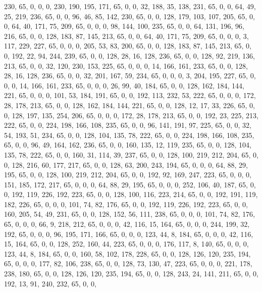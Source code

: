 \begin{DoxyCode}
       230, 65, 0, 0, 0, 230, 190, 195, 171, 65, 0, 0, 32, 188, 35, 138, 231, 65, 0, 0, 64, 49, 25, 219, 236, 65,
       0, 0, 96, 46, 85, 142, 230, 65, 0, 0, 128, 179, 103, 107, 205, 65, 0, 0, 64, 40, 171, 75, 209, 65, 0, 0, 0,
       98, 144, 100, 235, 65, 0, 0, 64, 131, 196, 96, 216, 65, 0, 0, 128, 183, 87, 145, 213, 65, 0, 0, 64, 40, 171,
       75, 209, 65, 0, 0, 0, 3, 117, 229, 227, 65, 0, 0, 0, 205, 53, 83, 200, 65, 0, 0, 128, 183, 87, 145, 213,
       65, 0, 0, 192, 22, 94, 244, 239, 65, 0, 0, 128, 28, 16, 128, 236, 65, 0, 0, 128, 92, 219, 136, 213, 65, 0, 0,
       32, 120, 230, 153, 225, 65, 0, 0, 0, 14, 166, 161, 233, 65, 0, 0, 128, 28, 16, 128, 236, 65, 0, 0, 32, 201,
       167, 59, 234, 65, 0, 0, 0, 3, 204, 195, 227, 65, 0, 0, 0, 14, 166, 161, 233, 65, 0, 0, 0, 26, 99, 40, 184,
       65, 0, 0, 128, 162, 184, 144, 221, 65, 0, 0, 0, 101, 53, 184, 191, 65, 0, 0, 192, 113, 232, 53, 222, 65, 0,
       0, 0, 172, 28, 178, 213, 65, 0, 0, 128, 162, 184, 144, 221, 65, 0, 0, 128, 12, 17, 33, 226, 65, 0, 0, 128,
       197, 135, 254, 206, 65, 0, 0, 0, 172, 28, 178, 213, 65, 0, 0, 192, 23, 225, 213, 222, 65, 0, 0, 224, 198, 166,
       108, 235, 65, 0, 0, 96, 141, 191, 97, 225, 65, 0, 0, 32, 54, 193, 51, 234, 65, 0, 0, 128, 104, 135, 78,
       222, 65, 0, 0, 224, 198, 166, 108, 235, 65, 0, 0, 96, 49, 164, 162, 236, 65, 0, 0, 160, 135, 12, 119, 235, 65,
       0, 0, 128, 104, 135, 78, 222, 65, 0, 0, 160, 31, 114, 39, 237, 65, 0, 0, 128, 100, 219, 212, 204, 65, 0, 0,
       128, 216, 60, 177, 217, 65, 0, 0, 128, 63, 200, 243, 194, 65, 0, 0, 0, 64, 88, 29, 195, 65, 0, 0, 128, 100,
       219, 212, 204, 65, 0, 0, 192, 92, 169, 247, 223, 65, 0, 0, 0, 151, 185, 172, 217, 65, 0, 0, 0, 64, 88, 29,
       195, 65, 0, 0, 0, 252, 106, 40, 187, 65, 0, 0, 192, 119, 226, 192, 223, 65, 0, 0, 128, 100, 116, 223, 214,
       65, 0, 0, 192, 191, 119, 182, 226, 65, 0, 0, 0, 101, 74, 82, 176, 65, 0, 0, 192, 119, 226, 192, 223, 65, 0, 0,
       160, 205, 54, 49, 231, 65, 0, 0, 128, 152, 56, 111, 238, 65, 0, 0, 0, 101, 74, 82, 176, 65, 0, 0, 0, 66, 9,
       218, 212, 65, 0, 0, 0, 42, 116, 15, 164, 65, 0, 0, 0, 244, 199, 32, 192, 65, 0, 0, 0, 96, 195, 171, 166,
       65, 0, 0, 0, 123, 44, 8, 184, 65, 0, 0, 0, 42, 116, 15, 164, 65, 0, 0, 128, 252, 160, 44, 223, 65, 0, 0, 0,
       176, 117, 8, 140, 65, 0, 0, 0, 123, 44, 8, 184, 65, 0, 0, 160, 58, 102, 178, 228, 65, 0, 0, 128, 126, 120,
       235, 194, 65, 0, 0, 0, 177, 82, 106, 238, 65, 0, 0, 128, 73, 130, 47, 223, 65, 0, 0, 0, 221, 178, 238, 180, 65,
       0, 0, 128, 126, 120, 235, 194, 65, 0, 0, 128, 243, 24, 141, 211, 65, 0, 0, 192, 13, 91, 240, 232, 65, 0, 0,

\end{DoxyCode}
